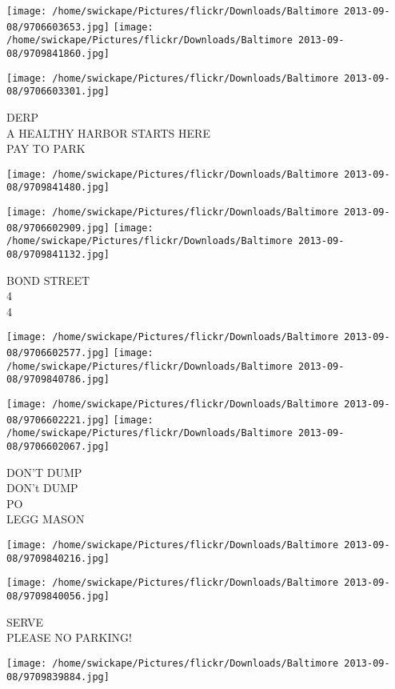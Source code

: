 \documentclass[10pt,letterpaper]{article}
\begin{document}
\texttt{[image: /home/swickape/Pictures/flickr/Downloads/Baltimore 2013-09-08/9706603653.jpg]}
\texttt{[image: /home/swickape/Pictures/flickr/Downloads/Baltimore 2013-09-08/9709841860.jpg]}

\texttt{[image: /home/swickape/Pictures/flickr/Downloads/Baltimore 2013-09-08/9706603301.jpg]}

DERP\\
A HEALTHY HARBOR STARTS HERE\\
PAY TO PARK
\pagebreak

\texttt{[image: /home/swickape/Pictures/flickr/Downloads/Baltimore 2013-09-08/9709841480.jpg]}

\vspace{0.25in}
\texttt{[image: /home/swickape/Pictures/flickr/Downloads/Baltimore 2013-09-08/9706602909.jpg]}
\texttt{[image: /home/swickape/Pictures/flickr/Downloads/Baltimore 2013-09-08/9709841132.jpg]}

BOND STREET\\
4\\
4
\pagebreak

\texttt{[image: /home/swickape/Pictures/flickr/Downloads/Baltimore 2013-09-08/9706602577.jpg]}
\texttt{[image: /home/swickape/Pictures/flickr/Downloads/Baltimore 2013-09-08/9709840786.jpg]}

\texttt{[image: /home/swickape/Pictures/flickr/Downloads/Baltimore 2013-09-08/9706602221.jpg]}
\texttt{[image: /home/swickape/Pictures/flickr/Downloads/Baltimore 2013-09-08/9706602067.jpg]}

DON'T DUMP\\
DON't DUMP\\
PO\\
LEGG MASON
\pagebreak

\texttt{[image: /home/swickape/Pictures/flickr/Downloads/Baltimore 2013-09-08/9709840216.jpg]}

\vspace{0.25in}
\texttt{[image: /home/swickape/Pictures/flickr/Downloads/Baltimore 2013-09-08/9709840056.jpg]}

SERVE\\
PLEASE NO PARKING!
\pagebreak

\texttt{[image: /home/swickape/Pictures/flickr/Downloads/Baltimore 2013-09-08/9709839884.jpg]}
\end{document}
